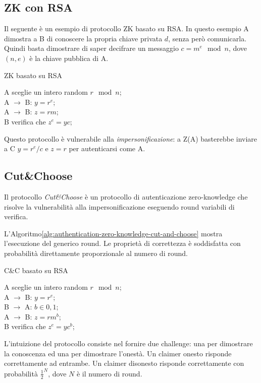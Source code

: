 \subsection{ZK con RSA}
Il seguente è un esempio di protocollo ZK basato su RSA. In questo esempio A dimostra a B di conoscere la propria chiave privata $d$, senza però comunicarla. Quindi basta dimostrare di saper decifrare un messaggio $c=m^{e} \mod n$, dove $(n,e)$ è la chiave pubblica di A.

\bigskip
\begin{algorithm}[H]
  \caption{ZK basato su RSA}
  \label{alg:authentication-zero-knowledge-rsa}
  \SetAlgoNoLine
  A sceglie un intero random $r \mod n$;\\
  A $\rightarrow$ B: $y=r^{e}$;\\
  A $\rightarrow$ B: $z=rm$;\\
  B verifica che $z^{e}=yc$;
\end{algorithm}

Questo protocollo è vulnerabile alla \textit{impersonificazione}: a Z(A) basterebbe inviare a C $y=r^{e}/c$ e $z=r$ per autenticarsi come A.


\subsection{Cut\&Choose}
Il protocollo \textit{Cut\&Choose} è un protocollo di autenticazione zero-knowledge che risolve la vulnerabilità alla impersonificazione eseguendo round variabili di verifica.

L'Algoritmo\ref{alg:authentication-zero-knowledge-cut-and-choose} mostra l'esecuzione del generico round. Le proprietà di correttezza è soddisfatta con probabilità direttamente proporzionale al numero di round.

\bigskip
\begin{algorithm}[H]
  \caption{C\&C basato su RSA}
  \label{alg:authentication-zero-knowledge-cut-and-choose}
  \SetAlgoNoLine
  A sceglie un intero random $r \mod n$;\\
  A $\rightarrow$ B: $y=r^{e}$;\\
  B $\rightarrow$ A: $b \in {0,1}$;\\
  A $\rightarrow$ B: $z=rm^{b}$;\\
  B verifica che $z^{e}=yc^{b}$;
\end{algorithm}

L'intuizione del protocollo consiste nel fornire due challenge: una per dimostrare la conoscenza ed una per dimostrare l'onestà. Un claimer onesto risponde correttamente ad entrambe. Un claimer disonesto risponde correttamente con probabilità $\frac{1}{2}^{N}$, dove $N$ è il numero di round.


